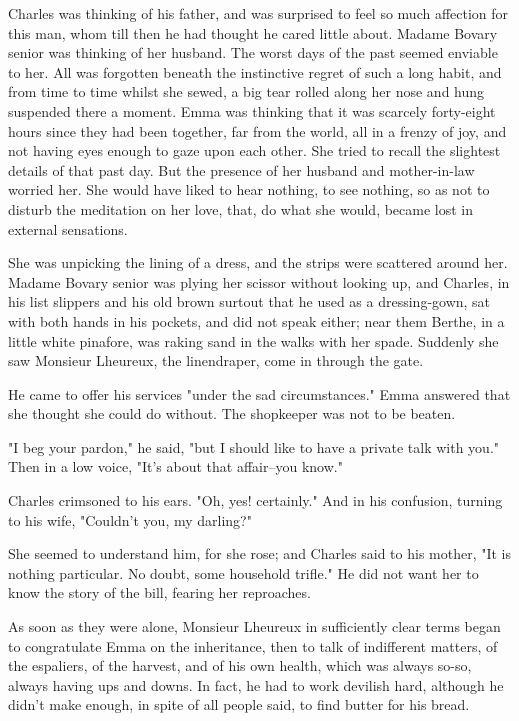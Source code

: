 \documentclass[11pt,twocolumn]{ltugboat}
\begin{document}
Charles was thinking of his father, and was surprised to feel so much
affection for this man, whom till then he had thought he cared little
about. Madame Bovary senior was thinking of her husband. The worst
days of the past seemed enviable to her. All was forgotten beneath the
instinctive regret of such a long habit, and from time to time whilst
she sewed, a big tear rolled along her nose and hung suspended there a
moment. Emma was thinking that it was scarcely forty-eight hours since
they had been together, far from the world, all in a frenzy of joy, and
not having eyes enough to gaze upon each other. She tried to recall the
slightest details of that past day. But the presence of her husband and
mother-in-law worried her. She would have liked to hear nothing, to see
nothing, so as not to disturb the meditation on her love, that, do what
she would, became lost in external sensations.

She was unpicking the lining of a dress, and the strips were scattered
around her. Madame Bovary senior was plying her scissor without looking
up, and Charles, in his list slippers and his old brown surtout that he
used as a dressing-gown, sat with both hands in his pockets, and did not
speak either; near them Berthe, in a little white pinafore, was raking
sand in the walks with her spade. Suddenly she saw Monsieur Lheureux,
the linendraper, come in through the gate.

He came to offer his services "under the sad circumstances." Emma
answered that she thought she could do without. The shopkeeper was not
to be beaten.

"I beg your pardon," he said, "but I should like to have a private talk
with you." Then in a low voice, "It's about that affair--you know."

Charles crimsoned to his ears. "Oh, yes! certainly." And in his
confusion, turning to his wife, "Couldn't you, my darling?"

She seemed to understand him, for she rose; and Charles said to his
mother, "It is nothing particular. No doubt, some household trifle." He
did not want her to know the story of the bill, fearing her reproaches.

As soon as they were alone, Monsieur Lheureux in sufficiently clear
terms began to congratulate Emma on the inheritance, then to talk of
indifferent matters, of the espaliers, of the harvest, and of his own
health, which was always so-so, always having ups and downs. In fact, he
had to work devilish hard, although he didn't make enough, in spite of
all people said, to find butter for his bread.
\end{document}
